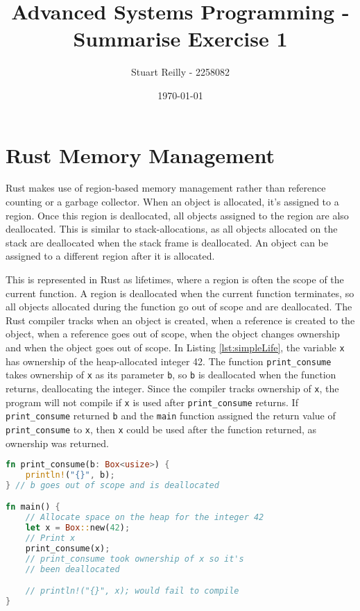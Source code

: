 \documentclass[10pt,a4paper,twocolumn]{article}
\begin{document}
\title{Advanced Systems Programming - Summarise Exercise 1}
\author{Stuart Reilly - 2258082}
\date{\today}

\maketitle

\section{Rust Memory Management}
\label{rustMem}
Rust makes use of region-based memory management rather than reference counting or a garbage
collector.
When an object is allocated, it's assigned to a region.
Once this region is deallocated, all objects assigned to the region are also deallocated.
This is similar to stack-allocations, as all objects allocated on the stack are deallocated
when the stack frame is deallocated.
An object can be assigned to a different region after it is allocated.

This is represented in Rust as lifetimes, where a region is often the scope of the current
function.
A region is deallocated when the current function terminates, so all objects allocated during
the function go out of scope and are deallocated.
The Rust compiler tracks when an object is created, when a reference is created to the object,
when a reference goes out of scope, when the object changes ownership and when the object goes
out of scope.
In Listing \ref{lst:simpleLife}, the variable \lstinline{x} has ownership of the heap-allocated
integer 42.
The function \lstinline{print_consume} takes ownership of \lstinline{x} as its parameter
\lstinline{b}, so \lstinline{b} is deallocated when the function returns, deallocating the integer.
Since the compiler tracks ownership of \lstinline{x}, the program will not compile if \lstinline{x}
is used after \lstinline{print_consume} returns.
If \lstinline{print_consume} returned \lstinline{b} and the \lstinline{main} function assigned the
return value of \lstinline{print_consume} to \lstinline{x}, then \lstinline{x} could be used after
the function returned, as ownership was returned.

\begin{lstlisting}[language=Rust, float=h, label=lst:simpleLife, caption={A short example of
	when a object is allocated and deallocated in Rust.}]
fn print_consume(b: Box<usize>) {
	println!("{}", b);
} // b goes out of scope and is deallocated

fn main() {
	// Allocate space on the heap for the integer 42
	let x = Box::new(42); 
	// Print x
	print_consume(x);
	// print_consume took ownership of x so it's
	// been deallocated

	// println!("{}", x); would fail to compile
}
\end{lstlisting}
\end{document}
